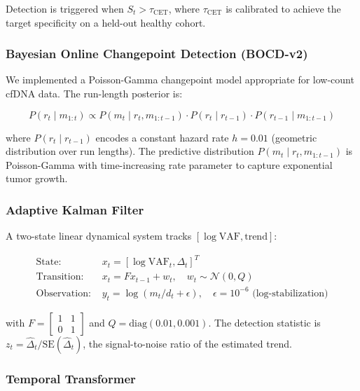 \documentclass[10pt,a4paper]{article}
\begin{document}
Detection is triggered when $S_t > \tau_{\text{CET}}$, where $\tau_{\text{CET}}$ is calibrated to achieve the target specificity on a held-out healthy cohort.

\subsubsection{Bayesian Online Changepoint Detection (BOCD-v2)}

We implemented a Poisson-Gamma changepoint model appropriate for low-count cfDNA data. The run-length posterior is:

\begin{equation}
P(r_t \mid m_{1:t}) \propto P(m_t \mid r_t, m_{1:t-1}) \cdot P(r_t \mid r_{t-1}) \cdot P(r_{t-1} \mid m_{1:t-1})
\end{equation}

where $P(r_t \mid r_{t-1})$ encodes a constant hazard rate $h = 0.01$ (geometric distribution over run lengths). The predictive distribution $P(m_t \mid r_t, m_{1:t-1})$ is Poisson-Gamma with time-increasing rate parameter to capture exponential tumor growth.

\subsubsection{Adaptive Kalman Filter}

A two-state linear dynamical system tracks $[\log \text{VAF}, \text{trend}]$:

\begin{align}
\text{State: } &x_t = [\log \text{VAF}_t, \Delta_t]^T \\
\text{Transition: } &x_t = F x_{t-1} + w_t, \quad w_t \sim \mathcal{N}(0, Q) \\
\text{Observation: } &y_t = \log(m_t/d_t + \epsilon), \quad \epsilon = 10^{-6} \text{ (log-stabilization)}
\end{align}

with $F = \begin{bmatrix} 1 & 1 \\ 0 & 1 \end{bmatrix}$ and $Q = \text{diag}(0.01, 0.001)$. The detection statistic is $z_t = \hat{\Delta}_t / \text{SE}(\hat{\Delta}_t)$, the signal-to-noise ratio of the estimated trend.

\subsubsection{Temporal Transformer}
\end{document}
